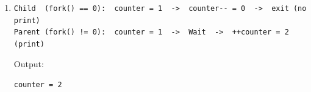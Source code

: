 \documentclass[11pt]{article}
\begin{document}
\begin{enumerate}[leftmargin=*]
Output:
\begin{Verbatim}
x=4
x=3
x=2
\end{Verbatim}

\item
\begin{Verbatim}
Child  (fork() == 0):  counter = 1  ->  counter-- = 0  ->  exit (no print)
Parent (fork() != 0):  counter = 1  ->  Wait  ->  ++counter = 2 (print)
\end{Verbatim}

Output:
\begin{Verbatim}
counter = 2
\end{Verbatim}

\end{enumerate}
\end{document}
